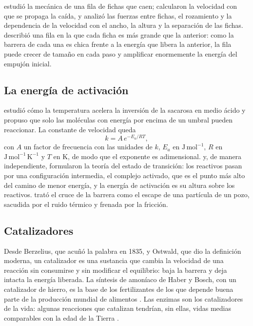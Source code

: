 \documentclass[11pt,a4paper]{article}
\begin{document}
\textcite{shaw1978} estudió la mecánica de una fila de fichas que caen; \textcite{mclachlan1983} calcularon la velocidad con que se propaga la caída, y \textcite{vanleeuwen2010} analizó las fuerzas entre fichas, el rozamiento y la dependencia de la velocidad con el ancho, la altura y la separación de las fichas. \textcite{whitehead1983} describió una fila en la que cada ficha es más grande que la anterior: como la barrera de cada una es chica frente a la energía que libera la anterior, la fila puede crecer de tamaño en cada paso y amplificar enormemente la energía del empujón inicial.

\subsection{La energía de activación}

\textcite{arrhenius1889} estudió cómo la temperatura acelera la inversión de la sacarosa en medio ácido y propuso que solo las moléculas con energía por encima de un umbral pueden reaccionar. La constante de velocidad queda
\begin{equation}\label{eq:arrhenius}
k = A\, e^{-E_a/RT},
\end{equation}
con $A$ un factor de frecuencia con las unidades de $k$, $E_a$ en $\mathrm{J\,mol^{-1}}$, $R$ en $\mathrm{J\,mol^{-1}\,K^{-1}}$ y $T$ en K, de modo que el exponente es adimensional. \textcite{eyring1935} y, de manera independiente, \textcite{evans1935} formularon la teoría del estado de transición: los reactivos pasan por una configuración intermedia, el complejo activado, que es el punto más alto del camino de menor energía, y la energía de activación es su altura sobre los reactivos. \textcite{kramers1940} trató el cruce de la barrera como el escape de una partícula de un pozo, sacudida por el ruido térmico y frenada por la fricción.

\subsection{Catalizadores}

Desde Berzelius, que acuñó la palabra en 1835, y Ostwald, que dio la definición moderna, un catalizador es una sustancia que cambia la velocidad de una reacción sin consumirse y sin modificar el equilibrio: baja la barrera y deja intacta la energía liberada. La síntesis de amoníaco de Haber y Bosch, con un catalizador de hierro, es la base de los fertilizantes de los que depende buena parte de la producción mundial de alimentos \parencite{smil2001}. Las enzimas son los catalizadores de la vida: algunas reacciones que catalizan tendrían, sin ellas, vidas medias comparables con la edad de la Tierra \parencite{wolfenden2001}.
\end{document}
